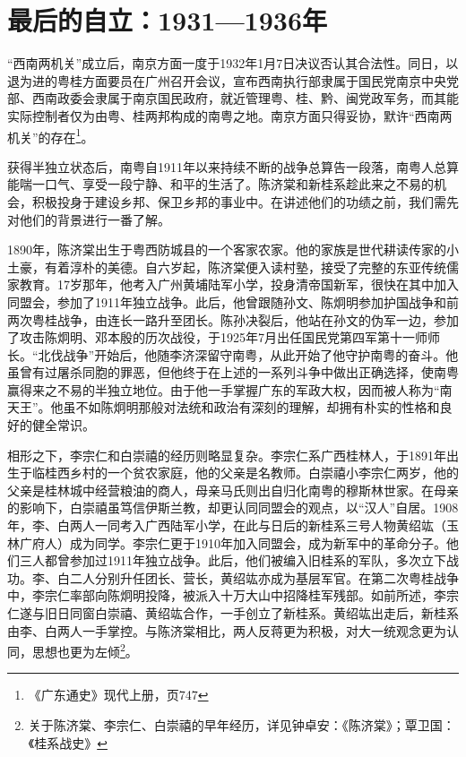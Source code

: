 \section{最后的自立：1931—1936年}


“西南两机关”成立后，南京方面一度于1932年1月7日决议否认其合法性。同日，以退为进的粤桂方面要员在广州召开会议，宣布西南执行部隶属于国民党南京中央党部、西南政委会隶属于南京国民政府，就近管理粤、桂、黔、闽党政军务，而其能实际控制者仅为由粤、桂两邦构成的南粤之地。南京方面只得妥协，默许“西南两机关”的存在\footnote{《广东通史》现代上册，页747}。

获得半独立状态后，南粤自1911年以来持续不断的战争总算告一段落，南粤人总算能喘一口气、享受一段宁静、和平的生活了。陈济棠和新桂系趁此来之不易的机会，积极投身于建设乡邦、保卫乡邦的事业中。在讲述他们的功绩之前，我们需先对他们的背景进行一番了解。

1890年，陈济棠出生于粤西防城县的一个客家农家。他的家族是世代耕读传家的小土豪，有着淳朴的美德。自六岁起，陈济棠便入读村塾，接受了完整的东亚传统儒家教育。17岁那年，他考入广州黄埔陆军小学，投身清帝国新军，很快在其中加入同盟会，参加了1911年独立战争。此后，他曾跟随孙文、陈炯明参加护国战争和前两次粤桂战争，由连长一路升至团长。陈孙决裂后，他站在孙文的伪军一边，参加了攻击陈炯明、邓本殷的历次战役，于1925年7月出任国民党第四军第十一师师长。“北伐战争”开始后，他随李济深留守南粤，从此开始了他守护南粤的奋斗。他虽曾有过屠杀同胞的罪恶，但他终于在上述的一系列斗争中做出正确选择，使南粤赢得来之不易的半独立地位。由于他一手掌握广东的军政大权，因而被人称为“南天王”。他虽不如陈炯明那般对法统和政治有深刻的理解，却拥有朴实的性格和良好的健全常识。

相形之下，李宗仁和白崇禧的经历则略显复杂。李宗仁系广西桂林人，于1891年出生于临桂西乡村的一个贫农家庭，他的父亲是名教师。白崇禧小李宗仁两岁，他的父亲是桂林城中经营粮油的商人，母亲马氏则出自归化南粤的穆斯林世家。在母亲的影响下，白崇禧虽笃信伊斯兰教，却更认同同盟会的观点，以“汉人”自居。1908年，李、白两人一同考入广西陆军小学，在此与日后的新桂系三号人物黄绍竑（玉林广府人）成为同学。李宗仁更于1910年加入同盟会，成为新军中的革命分子。他们三人都曾参加过1911年独立战争。此后，他们被编入旧桂系的军队，多次立下战功。李、白二人分别升任团长、营长，黄绍竑亦成为基层军官。在第二次粤桂战争中，李宗仁率部向陈炯明投降，被派入十万大山中招降桂军残部。如前所述，李宗仁遂与旧日同窗白崇禧、黄绍竑合作，一手创立了新桂系。黄绍竑出走后，新桂系由李、白两人一手掌控。与陈济棠相比，两人反蒋更为积极，对大一统观念更为认同，思想也更为左倾\footnote{关于陈济棠、李宗仁、白崇禧的早年经历，详见钟卓安：《陈济棠》；覃卫国：《桂系战史》}。

